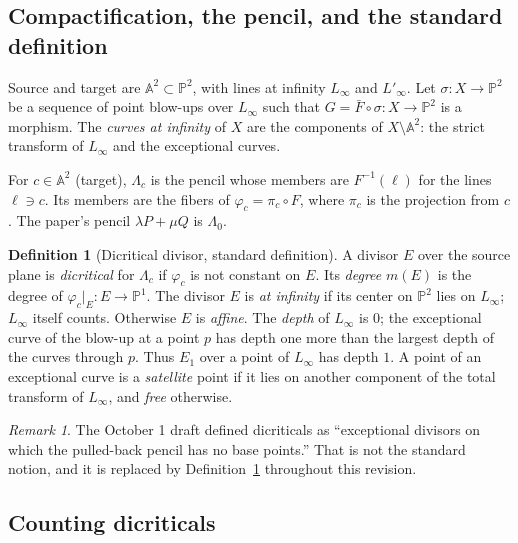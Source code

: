\documentclass[a4paper,11pt]{article}
\theoremstyle{plain}
\theoremstyle{definition}
\newtheorem{definition}[theorem]{Definition}
\theoremstyle{remark}
\newtheorem{remark}[theorem]{Remark}
\begin{document}
\subsection{Compactification, the pencil, and the standard definition}

Source and target are $\mathbb{A}^2 \subset \mathbb{P}^2$, with lines at infinity $L_\infty$
and $L'_\infty$. Let $\sigma \colon X \to \mathbb{P}^2$ be a sequence of point blow-ups over
$L_\infty$ such that $G = \bar{F} \circ \sigma \colon X \to \mathbb{P}^2$ is a morphism. The
\emph{curves at infinity} of $X$ are the components of $X \setminus \mathbb{A}^2$: the strict
transform of $L_\infty$ and the exceptional curves.

For $c \in \mathbb{A}^2$ (target), $\Lambda_c$ is the pencil whose members are $F^{-1}(\ell)$
for the lines $\ell \ni c$. Its members are the fibers of
$\varphi_c = \pi_c \circ F$, where $\pi_c$ is the projection from $c$. The paper's pencil
$\lambda P + \mu Q$ is $\Lambda_0$.

\begin{definition}[Dicritical divisor, standard definition]\label{def:dicritical}
A divisor $E$ over the source plane is \emph{dicritical} for $\Lambda_c$ if $\varphi_c$ is
not constant on $E$. Its \emph{degree} $m(E)$ is the degree of
$\varphi_c|_E \colon E \to \mathbb{P}^1$. The divisor $E$ is \emph{at infinity} if its center
on $\mathbb{P}^2$ lies on $L_\infty$; $L_\infty$ itself counts. Otherwise $E$ is
\emph{affine}. The \emph{depth} of $L_\infty$ is $0$; the exceptional curve of the blow-up at
a point $p$ has depth one more than the largest depth of the curves through $p$. Thus $E_1$
over a point of $L_\infty$ has depth $1$. A point of an exceptional curve is a
\emph{satellite} point if it lies on another component of the total transform of $L_\infty$,
and \emph{free} otherwise.
\end{definition}

\begin{remark}
The October 1 draft defined dicriticals as ``exceptional divisors on which the pulled-back
pencil has no base points.'' That is not the standard notion, and it is replaced by
Definition~\ref{def:dicritical} throughout this revision.
\end{remark}

\subsection{Counting dicriticals}
\end{document}
